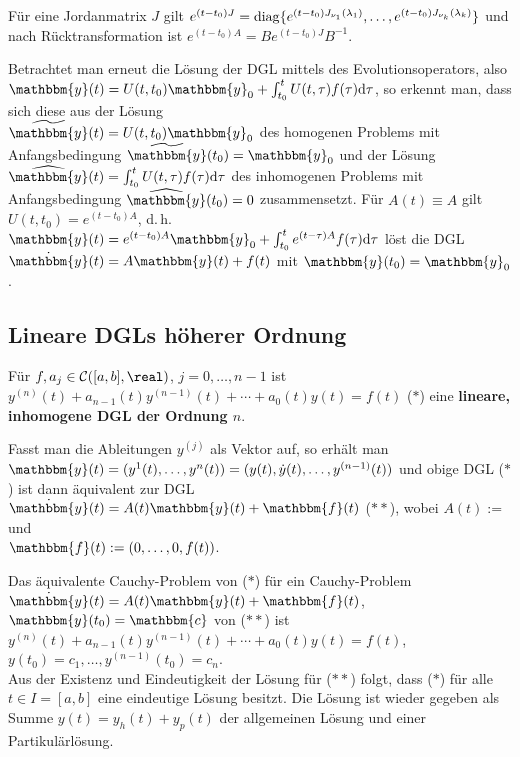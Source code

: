 Für eine Jordanmatrix $J$ gilt
$e^{(t - t_0) J} = \operatorname{diag}\{e^{(t - t_0) J_{\nu_1}(\lambda_1)}, \dotsc,
e^{(t - t_0) J_{\nu_k}(\lambda_k)}\}$
und nach Rücktransformation ist
$e^{(t - t_0) A} = B e^{(t - t_0) J} B^{-1}$.

\linie

Betrachtet man erneut die Lösung der DGL mittels des Evolutionsoperators,
also \\
$\mathbbm{y}(t) = U(t, t_0) \mathbbm{y}_0 +
\int_{t_0}^t U(t, \tau) f(\tau) \d\tau$,
so erkennt man, dass sich diese aus der Lösung \\
$\widetilde{\mathbbm{y}}(t) = U(t, t_0) \mathbbm{y}_0$
des homogenen Problems mit Anfangsbedingung
$\widetilde{\mathbbm{y}}(t_0) = \mathbbm{y}_0$ und der Lösung \\
$\widehat{\mathbbm{y}}(t) = \int_{t_0}^t U(t, \tau) f(\tau) \d\tau$
des inhomogenen Problems mit
Anfangsbedingung $\widehat{\mathbbm{y}}(t_0) = 0$ zusammensetzt.
Für $A(t) \equiv A$ gilt $U(t, t_0) = e^{(t - t_0) A}$, d.\,h.
$\mathbbm{y}(t) = e^{(t - t_0) A} \mathbbm{y}_0 +
\int_{t_0}^t e^{(t - \tau) A} f(\tau) \d\tau$
löst die DGL $\dot{\mathbbm{y}}(t) = A \mathbbm{y}(t) + f(t)$
mit $\mathbbm{y}(t_0) = \mathbbm{y}_0$.

\subsection{%
    Lineare DGLs höherer Ordnung%
}

Für $f, a_j \in \C([a, b], \real)$, $j = 0, \dotsc, n - 1$ ist
$y^{(n)}(t) + a_{n-1}(t) y^{(n-1)}(t) + \dotsb + a_0(t) y(t) = f(t)$ ($\ast$)
eine \textbf{lineare, inhomogene DGL der Ordnung $n$}.

Fasst man die Ableitungen $y^{(j)}$ als Vektor auf, so erhält man \\
$\mathbbm{y}(t) = (y^1(t), \dotsc, y^n(t)) =
(y(t), \dot{y}(t), \dotsc, y^{(n-1)}(t))$
und obige DGL ($\ast$) ist dann äquivalent zur DGL
$\dot{\mathbbm{y}}(t) = A(t) \mathbbm{y}(t) + \mathbbm{f}(t)$ ($\ast\ast$),
wobei $A(t) := $  und \\
$\mathbbm{f}(t) := (0, \dotsc, 0, f(t))$.

Das äquivalente Cauchy-Problem von ($\ast$) für ein Cauchy-Problem \\
$\dot{\mathbbm{y}}(t) = A(t) \mathbbm{y}(t) + \mathbbm{f}(t)$,
$\mathbbm{y}(t_0) = \mathbbm{c}$ von ($\ast\ast$) ist \\
$y^{(n)}(t) + a_{n-1}(t) y^{(n-1)}(t) + \dotsb + a_0(t) y(t) = f(t)$,
$y(t_0) = c_1, \dotsc, y^{(n-1)}(t_0) = c_n$. \\
Aus der Existenz und Eindeutigkeit der Lösung für ($\ast\ast$) folgt,
dass ($\ast$) für alle $t \in I = [a, b]$ eine eindeutige Lösung besitzt.
Die Lösung ist wieder gegeben als Summe
$y(t) = y_h(t) + y_p(t)$
der allgemeinen Lösung und einer Partikulärlösung.

